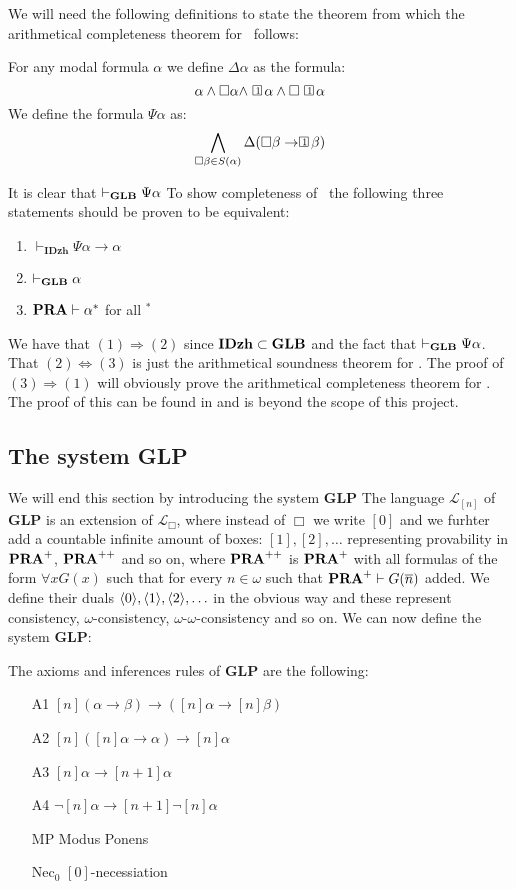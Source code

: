 \documentclass[../main.tex]{subfiles}
\begin{document}
We will need the following definitions to state the theorem from which the
arithmetical completeness theorem for \GLB\ follows:
\begin{defi}
	For any modal formula $\alpha$ we define $\Delta\alpha$ as the formula:
	\[\alpha\wedge\Box\alpha\wedge\OneBox\alpha\wedge\Box\OneBox\alpha\]
	We define the formula $\Psi\alpha$ as:
	\[\bigwedge_{\Box\beta\in
	S(\alpha)}\Delta(\Box\beta\rightarrow\OneBox\beta)\]
\end{defi}
It is clear that $\vdash_{\text{\textbf{GLB}}}\Psi\alpha$
To show completeness of \GLB\ the following three statements should be proven to
be equivalent:
\begin{enumerate}
	\item $\vdash_{\textbf{IDzh}}\Psi\alpha\rightarrow\alpha$
	\item $\vdash_{\text{\textbf{GLB}}}\alpha$
	\item $\text{\textbf{PRA}}\vdash\alpha^*$ for all $^*$
\end{enumerate}
We have that $(1)\Rightarrow (2)$ since $\text{\textbf{IDzh}}\subset\text{\textbf{GLB}}$ and the fact that
$\vdash_{\text{\textbf{GLB}}}\Psi\alpha$. That $(2)\Leftrightarrow(3)$ is just the arithmetical
soundness theorem for \GLB. The proof of $(3)\Rightarrow(1)$ will obviously
prove the arithmetical completeness theorem for \GLB.
The proof of this can be found in \cite{Boolos1993} and is beyond the scope of
this project.

\subsection{The system \textbf{GLP}}
We will end this section by introducing the system \textbf{GLP}
The language $\mathcal{L}_{[n]}$ of \textbf{GLP} is an extension of
$\mathcal{L}_\Box$, where instead of $\Box$ we write $[0]$ and we furhter add
a countable infinite amount of boxes:
$[1],[2],\ldots$ representing provability in $\text{\textbf{PRA}}^+$, $\text{\textbf{PRA}}^{++}$ and so on,
where $\text{\textbf{PRA}}^{++}$ is  $\text{\textbf{PRA}}^+$ with all formulas of the form $\forall x G(x)$
such that for every $n\in\omega$ such that $\text{\textbf{PRA}}^+\vdash G(\overline n)$ added. We
define their duals $\langle 0\rangle,\langle 1\rangle, \langle 2\rangle,\ldots$ in the obvious way and
these represent consistency, $\omega$-consistency,
$\omega$-$\omega$-consistency and so on. We can now define the system
\textbf{GLP}:
\begin{defi}
	The axioms and inferences rules of \textbf{GLP} are the following:
	\begin{enumerate}
		\item[A1]
			$[n](\alpha\rightarrow\beta)\rightarrow([n]\alpha\rightarrow[n]\beta)$
		\item[A2] $[n]([n]\alpha\rightarrow\alpha)\rightarrow[n]\alpha$
		\item[A3] $[n]\alpha\rightarrow[n+1]\alpha$
		\item[A4] $\neg[n]\alpha\rightarrow[n+1]\neg[n]\alpha$
		\item[MP] Modus Ponens
		\item[Nec$_0$] $[0]$-necessiation
	\end{enumerate}
\end{defi}
\end{document}
